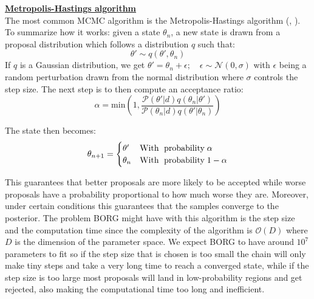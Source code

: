 \noindent \textbf{\underline{Metropolis-Hastings algorithm}} \\
The most common MCMC algorithm is the Metropolis-Hastings algorithm (\cite{Metropolis_1953}, \cite{Hastings_1970}). To summarize how it works: given a state $\theta_n$, a new state is drawn from a 
proposal distribution which follows a distribution $q$ such that: 
\begin{equation}
    \theta' \sim q(\theta', \theta_n) 
\end{equation}
If $q$ is a Gaussian distribution, we get $ \theta' = \theta_n + \epsilon; \quad \epsilon \sim \mathcal{N}(0, \sigma)$ with $\epsilon$ being a random perturbation drawn from the normal 
distribution where $\sigma$ controls the step size. 
The next step is to then compute an acceptance ratio:
\begin{equation}
    \alpha = \text{min}\left(1, \frac{\mathcal{P}(\theta'|d)q(\theta_n | \theta')}{\mathcal{P}(\theta_n|d)q(\theta'| \theta_n)} \right)
\end{equation}

The state then becomes: 
\begin{equation}
    \theta_{n+1}=
    \begin{cases}
        \theta' & \text{With\; probability\;} \alpha \\
        \theta_n & \text{With\; probability\;} 1-\alpha \\
    \end{cases}
\end{equation}

This guarantees that better proposals are more likely to be accepted while worse proposals have a probability proportional to how much worse they are. 
Moreover, under certain conditions this guarantees that the samples converge to the posterior. 
The problem BORG 
might have with this algorithm is the step size and the computation time since the complexity of the algorithm is $\mathcal{O}(D)$ where $D$ is the dimension of the parameter space. 
We expect BORG to have around $10^7$ parameters to fit so if the step size that is chosen is too small the chain will only make tiny steps and take a very long time to reach a converged state, while if the step size is too large most proposals will land 
in low-probability regions and get rejected, also making the computational time too long and inefficient. \\

